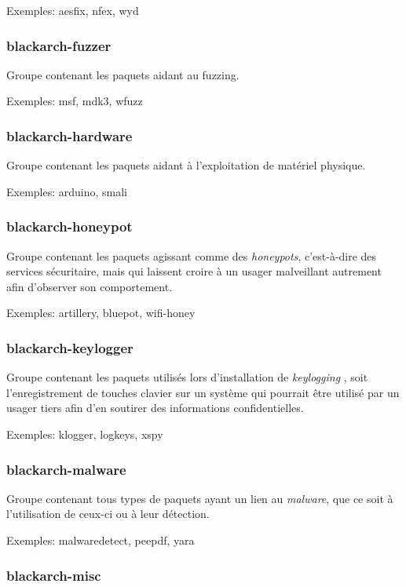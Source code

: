 \documentclass[a4paper, oneside, 11pt]{book}
\begin{document}
Exemples: aesfix, nfex, wyd

\subsubsection{blackarch-fuzzer}

Groupe contenant les paquets aidant au fuzzing.

Exemples: msf, mdk3, wfuzz

\subsubsection{blackarch-hardware}

Groupe contenant les paquets aidant à l'exploitation de matériel physique.

Exemples: arduino, smali

\subsubsection{blackarch-honeypot}

Groupe contenant les paquets agissant comme des \textit{honeypots}, c'est-à-dire
des services sécuritaire, mais qui laissent croire à un usager malveillant
autrement afin d'observer son comportement.

Exemples: artillery, bluepot, wifi-honey

\subsubsection{blackarch-keylogger}

Groupe contenant les paquets utilisés lors d'installation de \textit{keylogging}
, soit l'enregistrement de touches clavier sur un système qui pourrait être
utilisé par un usager tiers afin d'en soutirer des informations confidentielles.

Exemples: klogger, logkeys, xspy

\subsubsection{blackarch-malware}

Groupe contenant tous types de paquets ayant un lien au \textit{malware}, que ce
soit à l'utilisation de ceux-ci ou à leur détection.

Exemples: malwaredetect, peepdf, yara

\subsubsection{blackarch-misc}
\end{document}
